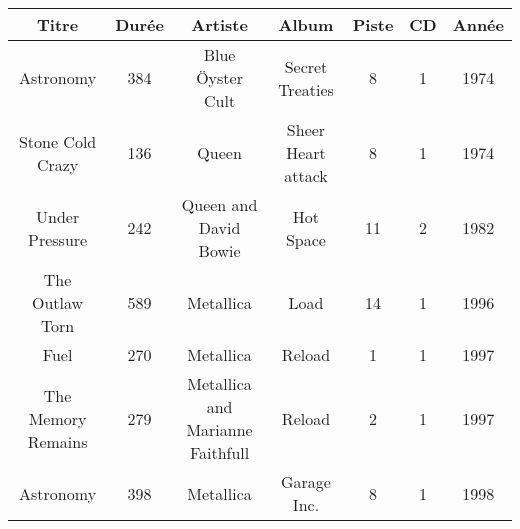 \documentclass[article,a4paper,firamath,12pt]{nsi}
\begin{document}
\begin{center}\tabstyle[UGLiOrange]
    \scriptsize
    \begin{tabular}{|c|c|c|c|c|c|c|}
        \hline
        \rowcolor{UGLiOrange} \color{white}\textbf{Titre} & \color{white}\textbf{Durée} & \color{white}\textbf{Artiste}            & \color{white}\textbf{Album} & \color{white}\textbf{Piste} & \color{white}\textbf{CD} & \color{white}\textbf{Année} \\
        \hline
        Astronomy                                         & 384                         & Blue Öyster Cult                         & Secret Treaties             & 8                           & 1                        & 1974                        \\
        \hline
        Stone Cold Crazy                                  & 136                         & Queen                                    & Sheer Heart attack          & 8                           & 1                        & 1974                        \\
        \hline
        Under Pressure                                    & 242                         & Queen and David Bowie                    & Hot Space                   & 11                          & 2                        & 1982                        \\
        \hline
        The Outlaw Torn                                   & 589                         & Metallica                                & Load                        & 14                          & 1                        & 1996                        \\
        \hline
        Fuel                                              & 270                         & Metallica                                & Reload                      & 1                           & 1                        & 1997                        \\
        \hline
        The Memory Remains                                & 279                         & Metallica and Marianne Faithfull         & Reload                      & 2                           & 1                        & 1997                        \\
        \hline
        Astronomy                                         & 398                         & Metallica                                & Garage Inc.                 & 8                           & 1                        & 1998                        \\

\end{tabular}
\end{center}
\end{document}
